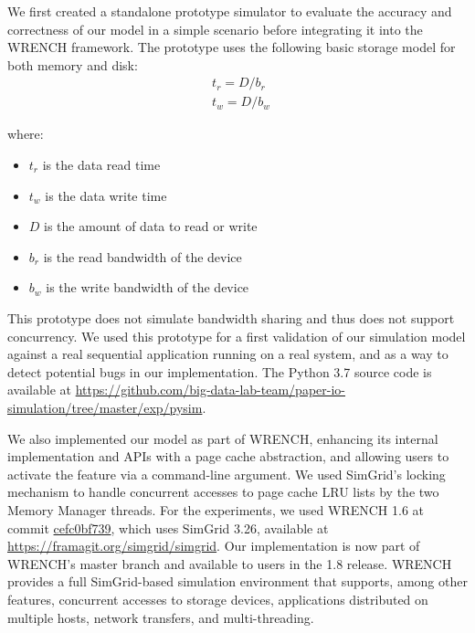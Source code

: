 \documentclass[conference]{IEEEtran}
\newcommand{\simgrid}{SimGrid\xspace}
\newcommand{\wrench}{WRENCH\xspace}
\begin{document}
            We first created a standalone prototype
            simulator to evaluate the accuracy and correctness of our
            model in a simple scenario before integrating it into the
            \wrench framework.
            The prototype uses the following basic storage model for
            both memory and disk:
            \begin{align*}
                & t_{r} = D / b_r \\
                & t_{w} = D / b_w\
            \end{align*}

            where:
            \begin{itemize}
                \item $t_{r}$ is the data read time
                \item $t_{w}$ is the data write time
                \item $D$ is the amount of data to read or write
                \item $b_r$ is the read bandwidth of the device
                \item $b_w$ is the write bandwidth of the device
            \end{itemize}

            This prototype does not simulate  bandwidth sharing and thus
            does not support concurrency. We used
            this prototype for a first validation of our simulation model
            against a real sequential application running on a real system,
            and as a way to detect potential bugs in our implementation.
            The Python 3.7 source code is available at
            \url{https://github.com/big-data-lab-team/paper-io-simulation/tree/master/exp/pysim}.

            We also implemented our model as part of \wrench, enhancing its
            internal implementation and APIs with a page cache abstraction,
            and allowing users to activate the feature via a command-line
            argument. We used SimGrid's locking mechanism to handle
            concurrent accesses to page cache LRU lists by the two Memory
            Manager threads. For the experiments, we used
            \wrench 1.6 at commit
            \href{https://github.com/dohoangdzung/wrench/tree/cefc0bf739d015b2329a62750a9d70085b65a3ae}{cefc0bf739},
            which uses \simgrid 3.26, available at
            \url{https://framagit.org/simgrid/simgrid}. Our implementation
            is now part of \wrench's master branch and available to
            users in the 1.8 release. \wrench provides a full \simgrid-based simulation 
            environment that supports, among other features, concurrent accesses to storage devices, 
            applications distributed on multiple hosts, network transfers, 
            and multi-threading. 
\end{document}
